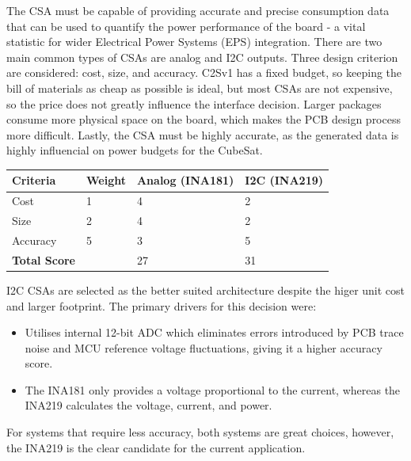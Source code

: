 The CSA must be capable of providing accurate and precise consumption data that can be used to quantify the power performance of the board - a vital statistic for wider Electrical Power Systems (EPS) integration. There are two main common types of CSAs are analog and I2C outputs.
\nl
Three design criterion are considered: cost, size, and accuracy. C2Sv1 has a fixed budget, so keeping the bill of materials as cheap as possible is ideal, but most CSAs are not expensive, so the price does not greatly influence the interface decision. Larger packages consume more physical space on the board, which makes the PCB design process more difficult. Lastly, the CSA must be highly accurate, as the generated data is highly influencial on power budgets for the CubeSat.

\begin{indentedtable}
    \centering
    \begin{tabular}{|l|l|l|l|}
        \hline
        \textbf{Criteria} & \textbf{Weight} & \textbf{Analog (INA181)} & \textbf{I2C (INA219)} \\
        \hline
        Cost & 1 & 4 & 2 \\
        \hline
        Size & 2 & 4 & 2 \\
        \hline
        Accuracy & 5 & 3 & 5 \\
        \hline
        \hline
        \textbf{Total Score} &  & 27 & 31 \\
        \hline
    \end{tabular}
    
    \caption{C2Sv1 CSA trade study (1-5). The \href{https://www.ti.com/product/INA181?keyMatch=INA181&tisearch=universal_search&usecase=GPN-ALT}{INA181} and \href{https://www.ti.com/product/INA219?litpdf=sboa203}{INA219} are used as references for analog and I2C CSAs, respectively.}
    \label{tab:v1-trade-csa}
\end{indentedtable}

I2C CSAs are selected as the better suited architecture despite the higer unit cost and larger footprint. The primary drivers for this decision were:

\begin{itemize}
    \item Utilises internal 12-bit ADC which eliminates errors introduced by PCB trace noise and MCU reference voltage fluctuations, giving it a higher accuracy score.
    \item The INA181 only provides a voltage proportional to the current, whereas the INA219 calculates the voltage, current, and power.
\end{itemize}

For systems that require less accuracy, both systems are great choices, however, the INA219 is the clear candidate for the current application.